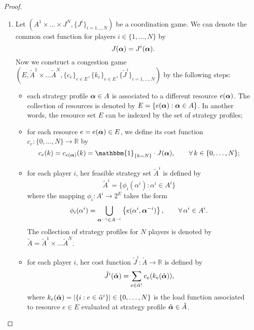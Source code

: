 \begin{proof}
	\ 
	\begin{enumerate}
		\item Let $(A^1 \times \ldots \times J^N, \{J^{i}\}_{i=1\ldots, N})$ be a coordination game. We can denote the common cost function for players $i \in \{1,\ldots,N\}$ by 
		$$
			J(\boldsymbol{\alpha}) = J^i (\boldsymbol{\alpha}).
		$$
		Now we construct a congestion game $(E, \tilde{A}^1 \times \ldots \tilde{A}^N, \{c_e\}_{e\in E}, \{k_e\}_{e\in E}, \{\tilde{J}^i\}_{i=1,\ldots,N})$ by the following steps:
		\begin{itemize}
			\item each strategy profile $\boldsymbol{\alpha} \in A$ is associated to a different resource $e(\boldsymbol{\alpha})$. The collection of resources is denoted by $E=\{ e(\boldsymbol{\alpha}):  \boldsymbol{\alpha} \in A \}$. In another words, the resource set $E$ can be indexed by the set of strategy profiles;
			\item for each resource $e = e(\boldsymbol{\alpha}) \in E$, we define its cost function $c_e: \{0,\ldots, N\} \to \mathbb{R}$ by
			$$
				c_e(k) = c_{e(\balpha)}(k) = \mathbbm{1}_{\{k = N\} } \cdot J(\balpha), \qquad \forall \, k \in \{0,\ldots,N\};
			$$
			\item for each player $i$, her feasible strategy set $\tilde{A}^i$ is defined by
			$$
				\tilde{A}^i = \{ \phi_i(\alpha^i) : \alpha^i \in A^i \}
			$$ 
			where the mapping $\phi_i: A^i \to 2^E$ takes the form
			$$
				\phi_i(\alpha^i) = \bigcup_{ \boldsymbol{\alpha}^{-i} \in A^{-i}} \left\{ e(\alpha^i, \boldsymbol{\alpha}^{-i}) \right\}, \qquad \forall \, \alpha^i \in A^i.
			$$
			The collection of strategy profiles for $N$ players is denoted by $\tilde{A} = \tilde{A}^1 \times \ldots \tilde{A}^N$.
			\item for each player $i$, her cost function $\tilde{J}^i: \tilde{A} \to \mathbb{R}$ is defined by
			$$
				\tilde{J}^i(\tilde{\boldsymbol{\alpha}}) = \sum_{e \in \tilde{\alpha}^i } c_e( k_e(\tilde{\boldsymbol{\alpha}})),
			$$
			where $k_e(\tilde{\boldsymbol{\alpha}}) = \vert \{ i : e \in \tilde{\alpha}^i \} \vert \in \{0,\ldots,N\}$ is the load function associated to resource $e \in E$ evaluated at strategy profile $\tilde{\boldsymbol{\alpha}} \in \tilde{A}$.
		\end{itemize}
		

\end{enumerate}
\end{proof}
